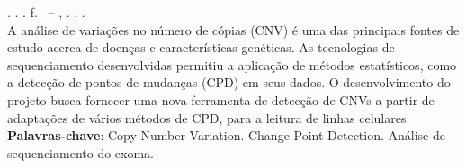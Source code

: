 
\begin{resumo}[RESUMO]
\begin{SingleSpacing}

\imprimirautorcitacao. \imprimirtitulo. \imprimirdata. \pageref {LastPage} f. \imprimirprojeto\ – \imprimirprograma, \imprimirinstituicao. \imprimirlocal, \imprimirdata.\\


A análise de variações no número de cópias (CNV) é uma das principais fontes de estudo acerca de doenças e características genéticas.
As tecnologias de sequenciamento desenvolvidas permitiu a aplicação de métodos estatísticos, como a detecção de pontos de mudanças (CPD) em seus dados.
O desenvolvimento do projeto busca fornecer uma nova ferramenta de detecção de CNVs a partir de adaptações de vários métodos de CPD, para a leitura de linhas celulares. \\

\textbf{Palavras-chave}: Copy Number Variation. Change Point Detection. Análise de sequenciamento do exoma.

\end{SingleSpacing}
\end{resumo}

